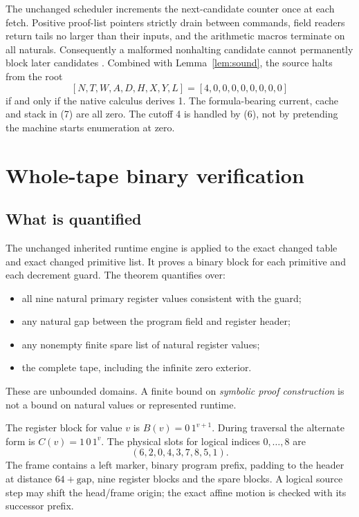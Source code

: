 \documentclass[11pt,a4paper]{article}
\theoremstyle{remark}\newtheorem{remark}[theorem]{Remark}
\begin{document}
The unchanged scheduler increments the next-candidate counter once at
each fetch. Positive proof-list pointers strictly drain between
commands, field readers return tails no larger than their inputs,
and the arithmetic macros terminate on all naturals.
Consequently a malformed nonhalting candidate cannot permanently block
later candidates \cite{commands}. Combined with
Lemma~\ref{lem:sound}, the source halts from the root
\[
 [N,T,W,A,D,H,X,Y,L]=[4,0,0,0,0,0,0,0,0]
                                                               \tag{7}
\]
if and only if the native calculus derives 1. The formula-bearing
current, cache and stack in (7) are all zero. The cutoff 4 is handled
by (6), not by pretending the machine starts enumeration at zero.

\section{Whole-tape binary verification}

\subsection{What is quantified}

The unchanged inherited runtime engine is applied to the exact changed
table and exact changed primitive list. It proves a binary block for
each primitive and each decrement guard. The theorem quantifies over:
\begin{itemize}
\item all nine natural primary register values consistent with the guard;
\item any natural gap between the program field and register header;
\item any nonempty finite spare list of natural register values;
\item the complete tape, including the infinite zero exterior.
\end{itemize}
These are unbounded domains. A finite bound on \emph{symbolic proof
construction} is not a bound on natural values or represented runtime.

The register block for value $v$ is $B(v)=0\,1^{v+1}$.
During traversal the alternate form is $C(v)=1\,0\,1^v$.
The physical slots for logical indices $0,\ldots,8$ are
\[
 (6,2,0,4,3,7,8,5,1).
\]
The frame contains a left marker, binary program prefix, padding to
the header at distance $64+\mathrm{gap}$, nine register blocks and
the spare blocks. A logical source step may shift the head/frame
origin; the exact affine motion is checked with its successor prefix.
\end{document}
